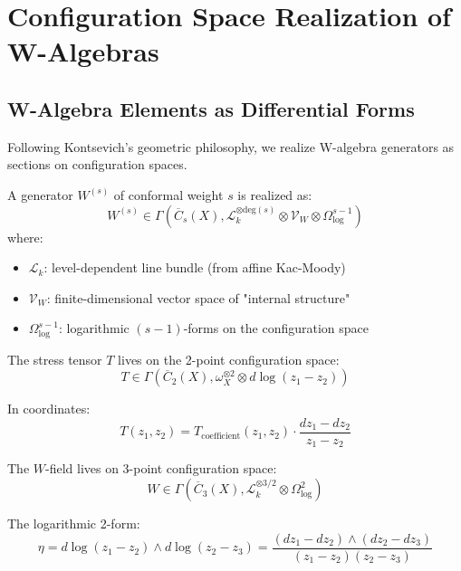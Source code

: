 \section{Configuration Space Realization of W-Algebras}

\subsection{W-Algebra Elements as Differential Forms}

Following Kontsevich's geometric philosophy, we realize W-algebra generators as sections on configuration spaces.

\begin{construction}
A generator $W^{(s)}$ of conformal weight $s$ is realized as:
\begin{equation}
W^{(s)} \in \Gamma\left(\overline{C}_s(X), \mathcal{L}_k^{\otimes \text{deg}(s)} \otimes \mathcal{V}_{W} \otimes \Omega^{s-1}_{\log}\right)
\end{equation}
where:
\begin{itemize}
\item $\mathcal{L}_k$: level-dependent line bundle (from affine Kac-Moody)
\item $\mathcal{V}_W$: finite-dimensional vector space of "internal structure"
\item $\Omega^{s-1}_{\log}$: logarithmic $(s-1)$-forms on the configuration space
\end{itemize}
\end{construction}

\begin{example}
The stress tensor $T$ lives on the 2-point configuration space:
\begin{equation}
T \in \Gamma(\overline{C}_2(X), \omega_X^{\otimes 2} \otimes d\log(z_1-z_2))
\end{equation}

In coordinates:
\begin{equation}
T(z_1, z_2) = T_{\text{coefficient}}(z_1, z_2) \cdot \frac{dz_1 - dz_2}{z_1 - z_2}
\end{equation}
\end{example}

\begin{example}
The $W$-field lives on 3-point configuration space:
\begin{equation}
W \in \Gamma(\overline{C}_3(X), \mathcal{L}_k^{\otimes 3/2} \otimes \Omega^2_{\log})
\end{equation}

The logarithmic 2-form:
\begin{equation}
\eta = d\log(z_1-z_2) \wedge d\log(z_2-z_3) = \frac{(dz_1-dz_2) \wedge (dz_2-dz_3)}{(z_1-z_2)(z_2-z_3)}
\end{equation}
\end{example}

